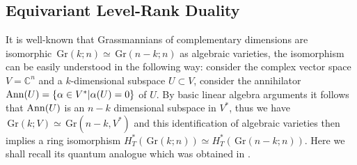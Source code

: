 \documentclass[12pt]{amsart}
\newcommand{\Gr}{\,\mathrm{Gr}}
\numberwithin{equation}{section}
\numberwithin{figure}{section}
\begin{document}
\subsection{Equivariant Level-Rank Duality}\label{sec:LRduality}
It is well-known that Grassmannians of complementary dimensions are isomorphic $\Gr(k ; n) \simeq \Gr(n - k; n)$ as algebraic varieties, the isomorphism can be easily understood in the following way: consider the complex vector space $V = \mathbb{C}^n$ and a $k$-dimensional subspace $U \subset V$, consider the annihilator ${\rm Ann}(U)= \{ \alpha \in V^* | \alpha(U) = 0 \}$ of $U$. By basic linear algebra arguments it follows that ${\rm Ann}(U)$ is an $n-k$ dimensional subspace in $V^*$, thus we have $\Gr(k; V) \simeq \Gr(n - k, V^*)$ and this identification of algebraic varieties then implies a ring isomorphism $H^*_T(\Gr(k;n))\simeq H^*_T(\Gr(n-k;n))$. Here we shall recall its quantum analogue which was obtained in \cite[Cor. 6.8.]{gorbounovkorff2014}.
\end{document}
